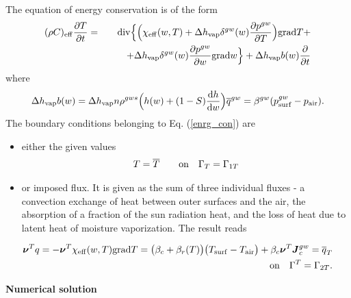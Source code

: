 The equation of energy conservation is of the form
\begin{eqnarray}\label{enrg_con}
( \rho C)_{\rm eff} \frac{\partial T}{\partial t} &=& {\rm div} \Big\{ \Big(\chi_{\rm eff} (w, 
T) +  \Delta h_{\rm vap} \delta^{gw}(w) \frac{\partial p^{gw}}{\partial T} \Big) {\rm grad} T +\\
&& \qquad  +\Delta h_{\rm vap} \delta^{gw}(w) \frac{\partial p^{gw}}{\partial w} {\rm grad} w \Big\} +  \Delta h_{\rm vap} b(w) 
\frac{\partial}{\partial t}\nonumber
\end{eqnarray}
where
\begin{eqnarray}
 \Delta h_{\rm vap} b(w) =  \Delta h_{\rm vap} n \rho^{gws} \Big( h(w) + (1-S)\frac{{\rm d} h}{{\rm d} w}\Big )
\overline{q}^{gw} = \beta^{gw} (p_{\rm surf}^{gw} - p_{\rm air}).
\end{eqnarray}
The boundary conditions belonging to Eq. (\ref{enrg_con}) are
\begin{itemize}
\item{either the given values}
\begin{eqnarray}
T = \overline{T} \qquad {\rm on} \quad \Gamma_{T} = \Gamma_{1 T}
\end{eqnarray}
\item{or imposed flux. It is given as the sum of three individual fluxes - a convection exchange 
of heat between outer surfaces and the air, the absorption of a fraction of the sun radiation 
heat, and the loss of heat due to latent heat of moisture vaporization. The result reads}
\end{itemize}
\begin{eqnarray}
\mbox{\boldmath$\nu$}^T q = - \mbox{\boldmath$\nu$}^T \chi_{\rm eff}(w,T) {\rm grad} T  = 
\big(\beta_c + \beta_r(T)\big) \big(T_{\rm surf} - T_{\rm air}\big) + \beta_c \mbox{\boldmath$\nu$}^T 
\mbox{\boldmath$J$}_c^{gw}= \overline{q}_{T}\nonumber\\
{\rm on} \quad \Gamma^{T} = \Gamma_{2 T}.
\end{eqnarray}

{\bf Numerical solution}\\


